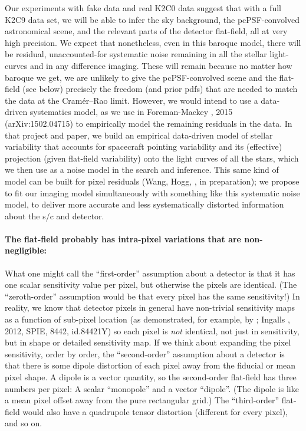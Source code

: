 \documentclass[12pt,preprint]{aastex}
\begin{document}
Our experiments with fake data and real K2C0 data suggest that with a
full K2C9 data set, we will be able to infer the sky background, the
pcPSF-convolved astronomical scene, and the relevant parts of the
detector flat-field, all at very high precision.
We expect that nonetheless, even in this baroque model, there will
be residual, unaccounted-for systematic noise remaining in all the
stellar light-curves and in any difference imaging.
These will remain because no matter how baroque we get, we are
unlikely to give the pcPSF-convolved scene and the flat-field (see
below) precisely the freedom (and prior pdfs) that are needed to match
the data at the Cram\'er--Rao limit.
However, we would intend to use a data-driven systematics model, as we
use in Foreman-Mackey \etal, 2015 (arXiv:1502.04715) to empirically
model the remaining residuals in the data.
In that project and paper, we build an empirical data-driven model of
stellar variability that accounts for spacecraft pointing variability
and its (effective) projection (given flat-field variability) onto the
light curves of all the stars, which we then use as a noise model in
the search and inference.
This same kind of model can be built for pixel residuals (Wang, Hogg, \etal, in preparation);
we propose to fit our imaging model simultaneously with something like this systematic
noise model, to deliver more accurate and less systematically distorted
information about the s/c and detector.

\paragraph{The flat-field probably has intra-pixel variations that are non-negligible:}

What one might call the ``first-order'' assumption about a detector is
that it has one scalar sensitivity value per pixel, but otherwise the
pixels are identical.
(The ``zeroth-order'' assumption would be that every pixel has the same
sensitivity!)
In reality, we know that detector pixels in general have non-trivial sensitivity maps as a
function of sub-pixel location (as demonstrated, for example, by \spitzer;
Ingalls \etal, 2012, SPIE, 8442, id.84421Y)
so each pixel is \emph{not} identical,
not just in sensitivity, but in shape or detailed sensitivity map.
If we think about expanding the pixel sensitivity, order by order, the
``second-order'' assumption about a detector is that there is some dipole
distortion of each pixel away from the fiducial or mean pixel shape.
A dipole is a vector quantity, so the second-order flat-field has
three numbers per pixel: A scalar ``monopole'' and a vector
``dipole''.
(The dipole is like a mean pixel offset away from the pure rectangular
grid.)
The ``third-order'' flat-field would also have a quadrupole tensor
distortion (different for every pixel), and so on.
\end{document}
